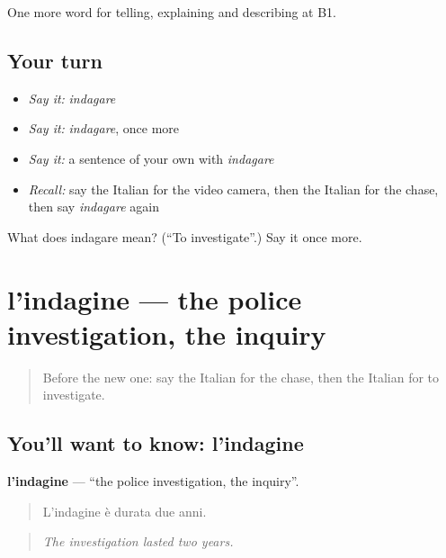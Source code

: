 \begin{grammarlens}[title={What you've built}]
One more word for telling, explaining and describing at B1.
\end{grammarlens}

\subsection*{Your turn}
\begin{itemize}
\raggedright
  \item \emph{Say it:} \emph{indagare}
  \item \emph{Say it:} \emph{indagare}, once more
  \item \emph{Say it:} a sentence of your own with \emph{indagare}
  \item \emph{Recall:} say the Italian for the video camera, then the Italian for the chase, then say \emph{indagare} again
\end{itemize}

\begin{tcolorbox}[breakable,colback=teal!4,colframe=teal!35!black,title={Before you move on}]
What does indagare mean? (\textquotedblleft{}To investigate\textquotedblright{}.) Say it once more.
\end{tcolorbox}
\section[l'indagine]{l'indagine — the police investigation, the inquiry}

\label{lesson:IT-C295-indagine}



\begin{quote}
Before the new one: say the Italian for the chase, then the Italian for to investigate.
\end{quote}

\subsection*{You'll want to know: l'indagine}
\textbf{l'indagine} — \textquotedblleft{}the police investigation, the inquiry\textquotedblright{}.

\begin{quote}
L'indagine è durata due anni.
\end{quote}

\begin{quote}
\emph{The investigation lasted two years.}
\end{quote}

